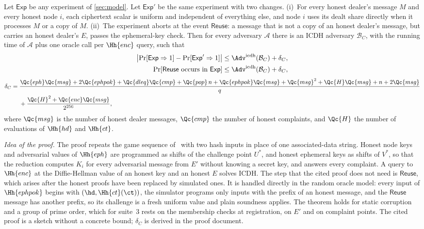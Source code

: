 \begin{theorem}\label{thm:enc}
Let $\mathsf{Exp}$ be any experiment of \cref{sec:model}. Let $\mathsf{Exp}'$ be the same experiment with two changes. \textup{(i)}~For every honest dealer's message $M$ and every honest node $i$, each ciphertext scalar is uniform and independent of everything else, and node $i$ uses its dealt share directly when it processes $M$ or a copy of $M$. \textup{(ii)}~The experiment aborts at the event $\mathsf{Reuse}$: a message that is not a copy of an honest dealer's message, but carries an honest dealer's $E$, passes the ephemeral-key check. Then for every adversary $\mathcal{A}$ there is an ICDH adversary $\mathcal{B}_C$, with the running time of $\mathcal{A}$ plus one oracle call per $\Hh{enc}$ query, such that
\begin{align*}
  \bigl|\Pr[\mathsf{Exp} \Rightarrow 1] - \Pr[\mathsf{Exp}' \Rightarrow 1]\bigr| &\le \Adv^{\mathrm{icdh}}(\mathcal{B}_C) + \delta_C , \\
  \Pr[\mathsf{Reuse} \text{ occurs in } \mathsf{Exp}] &\le \Adv^{\mathrm{icdh}}(\mathcal{B}_C) + \delta_C ,
\end{align*}
\begin{align*}
  \delta_C ={}& \frac{\Qc{eph}\Qc{msg} + 2\Qc{ephpok} + \Qc{dleq}\Qc{cmp} + \Qc{pop}\,n + \Qc{ephpok}\Qc{msg} + \Qc{msg}^2 + \Qc{H}\Qc{msg} + n + 2\Qc{msg}}{q} \\
  &+ \frac{\Qc{H}^2 + \Qc{enc}\Qc{msg}}{2^{256}} ,
\end{align*}
where $\Qc{msg}$ is the number of honest dealer messages, $\Qc{cmp}$ the number of honest complaints, and $\Qc{H}$ the number of evaluations of $\Hh{hd}$ and $\Hh{ct}$.
\end{theorem}

\emph{Idea of the proof.} The proof repeats the game sequence of~\cite[Theorem~2]{GS22} with two hash inputs in place of one associated-data string. Honest node keys and adversarial values of $\Hh{eph}$ are programmed as shifts of the challenge point $U^*$, and honest ephemeral keys as shifts of $V^*$, so that the reduction computes $K_i$ for every adversarial message from $E'$ without knowing a secret key, and answers every complaint. A query to $\Hh{enc}$ at the Diffie-Hellman value of an honest key and an honest $E$ solves ICDH. The step that the cited proof does not need is $\mathsf{Reuse}$, which arises after the honest proofs have been replaced by simulated ones. It is handled directly in the random oracle model: every input of $\Hh{ephpok}$ begins with $(\hd, \Hh{ct}(\ct))$, the simulator programs only inputs with the prefix of an honest message, and the $\mathsf{Reuse}$ message has another prefix, so its challenge is a fresh uniform value and plain soundness applies. The theorem holds for static corruption and a group of prime order, which for suite~3 rests on the membership checks at registration, on $E'$ and on complaint points. The cited proof is a sketch without a concrete bound; $\delta_C$ is derived in the proof document.

